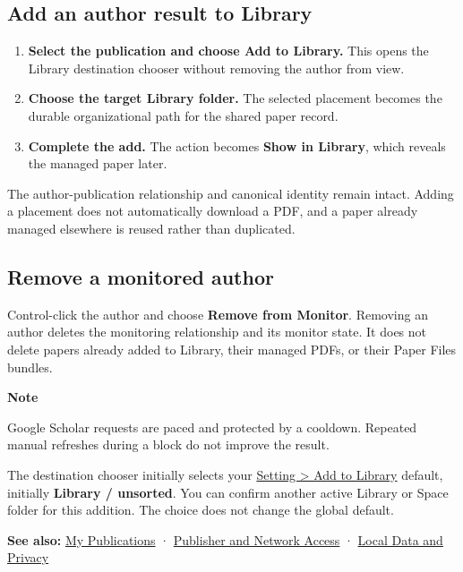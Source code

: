 \documentclass[10pt,letterpaper,oneside]{scrreprt}
\providecommand{\tightlist}{\setlength{\itemsep}{1pt}\setlength{\parskip}{0pt}}
\newenvironment{GewuRelated}{\par\nobreak\vspace{3pt}\nobreak\begingroup\small\sffamily\begin{samepage}\noindent}{\par\end{samepage}\endgroup}
\renewenvironment{quote}
  {\Needspace{5\baselineskip}\begin{tcolorbox}[enhanced,breakable,colback=GewuPale,colframe=GewuPale,boxrule=0pt,
    borderline west={1.6pt}{0pt}{GewuBlue},arc=1.2mm,left=2.5mm,right=2.5mm,top=1.7mm,bottom=1.7mm,
    before skip=4pt,after skip=5pt,fontupper=\color{GewuInk}\small]}
  {\end{tcolorbox}}
\begin{document}
\subsection{Add an author result to Library}\label{add-an-author-result-to-library}

\begin{enumerate}
\tightlist
\item
  \textbf{Select the publication and choose \textbf{Add to Library}.} This opens the Library destination chooser without removing the author from view.
\item
  \textbf{Choose the target Library folder.} The selected placement becomes the durable organizational path for the shared paper record.
\item
  \textbf{Complete the add.} The action becomes \textbf{Show in Library}, which reveals the managed paper later.
\end{enumerate}

The author-publication relationship and canonical identity remain intact. Adding a placement does not automatically download a PDF, and a paper already managed elsewhere is reused rather than duplicated.

\subsection{Remove a monitored author}\label{remove-a-monitored-author}

Control-click the author and choose \textbf{Remove from Monitor}. Removing an author deletes the monitoring relationship and its monitor state. It does not delete papers already added to Library, their managed PDFs, or their Paper Files bundles.

\begin{quote}
\textbf{Note}

Google Scholar requests are paced and protected by a cooldown. Repeated manual refreshes during a block do not improve the result.
\end{quote}

The destination chooser initially selects your \hyperref[add-to-library-settings]{Setting \textgreater{} Add to Library} default, initially \textbf{Library / unsorted}. You can confirm another active Library or Space folder for this addition. The choice does not change the global default.

\begin{GewuRelated}
\textbf{See also:} \hyperref[my-publications]{My Publications} · \hyperref[network-access]{Publisher and Network Access} · \hyperref[privacy]{Local Data and Privacy}
\end{GewuRelated}
\end{document}
